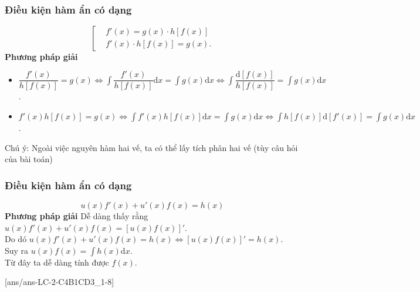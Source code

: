 \begin{dang}{~}
	\subsubsection{Điều kiện hàm ẩn có dạng}
	$$\left[ \begin{aligned}
			 & f'(x)=g(x)\cdot h\left[ f(x) \right]  \\
			 & f'(x)\cdot h\left[ f(x) \right]=g(x).
		\end{aligned} \right.$$
	\textbf{Phương pháp giải}
	\begin{itemize}[\color{blue}\faPencilSquareO]
		\item $\dfrac{f'(x)}{h[f(x)]}=g(x) \Leftrightarrow \displaystyle\int \dfrac{f'(x)}{h[f(x)]}\mathrm{d}x =\int  {g(x)}\mathrm{d}x \Leftrightarrow \int\dfrac{\mathrm{d}\left[ f(x) \right]}{h\left[ f(x) \right]} =\int  {g(x)\mathrm{d}x}$.
		\item $f'(x)h[f(x)]=g(x)
			      \Leftrightarrow
			      \displaystyle\int f'(x)h[f(x)]\mathrm{d}x=\int g(x)\mathrm{d}x
			      \Leftrightarrow
			      \int h[f(x)]\mathrm{d}\left[ f'(x) \right]=\int g(x)\mathrm{d}x$.
	\end{itemize}
	Chú ý: Ngoài việc nguyên hàm hai vế, ta có thể lấy tích phân hai vế (tùy câu hỏi của bài toán)
	\subsubsection{Điều kiện hàm ẩn có dạng}
	$$u(x)f'(x)+u'(x)f(x)=h(x)$$
	\textbf{Phương pháp giải}
	Dễ dàng thấy rằng $u(x)f'(x)+u'(x)f(x)=[u(x)f(x)]'$.\\
	Do dó $u(x)f'(x)+u'(x)f(x)=h(x) \Leftrightarrow [u(x)f(x)]'=h(x)$.\\
	Suy ra $u(x)f(x)=\displaystyle\int   h(x)\mathrm{d}x$.\\
	Từ đây ta dễ dàng tính được $f(x)$.
\end{dang}

{}[ans/ans-LC-2-C4B1CD3_1-8]

